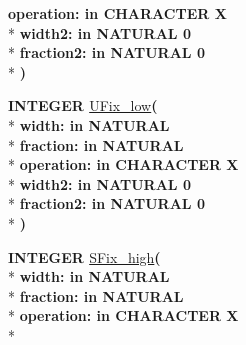 \begin{DoxyCompactItemize}
{\bfseries \textcolor{vhdlchar}{operation\+: }\textcolor{stringliteral}{in }\textcolor{vhdlchar}{C\+H\+A\+R\+A\+C\+T\+E\+R   \textquotesingle{}\+X\textquotesingle{}}}\\*
{\bfseries \textcolor{vhdlchar}{width2\+: }\textcolor{stringliteral}{in }\textcolor{vhdlchar}{N\+A\+T\+U\+R\+A\+L   0}}\\*
{\bfseries \textcolor{vhdlchar}{fraction2\+: }\textcolor{stringliteral}{in }\textcolor{vhdlchar}{N\+A\+T\+U\+R\+A\+L   0}}\\*
{\bfseries  )} 
\item 
{\bfseries {\bfseries \textcolor{comment}{I\+N\+T\+E\+G\+E\+R}\textcolor{vhdlchar}{ }}} \hyperlink{classfixed__pkg_a7f9fdb627be4d6f5667b2ce8f7c6d30f}{U\+Fix\+\_\+low}{\bfseries  ( }\\*
{\bfseries \textcolor{vhdlchar}{width\+: }\textcolor{stringliteral}{in }{\bfseries \textcolor{comment}{N\+A\+T\+U\+R\+A\+L}\textcolor{vhdlchar}{ }}}\\*
{\bfseries \textcolor{vhdlchar}{fraction\+: }\textcolor{stringliteral}{in }{\bfseries \textcolor{comment}{N\+A\+T\+U\+R\+A\+L}\textcolor{vhdlchar}{ }}}\\*
{\bfseries \textcolor{vhdlchar}{operation\+: }\textcolor{stringliteral}{in }\textcolor{vhdlchar}{C\+H\+A\+R\+A\+C\+T\+E\+R   \textquotesingle{}\+X\textquotesingle{}}}\\*
{\bfseries \textcolor{vhdlchar}{width2\+: }\textcolor{stringliteral}{in }\textcolor{vhdlchar}{N\+A\+T\+U\+R\+A\+L   0}}\\*
{\bfseries \textcolor{vhdlchar}{fraction2\+: }\textcolor{stringliteral}{in }\textcolor{vhdlchar}{N\+A\+T\+U\+R\+A\+L   0}}\\*
{\bfseries  )} 
\item 
{\bfseries {\bfseries \textcolor{comment}{I\+N\+T\+E\+G\+E\+R}\textcolor{vhdlchar}{ }}} \hyperlink{classfixed__pkg_a893c6f6a8b24350454e8cd0b683c9af7}{S\+Fix\+\_\+high}{\bfseries  ( }\\*
{\bfseries \textcolor{vhdlchar}{width\+: }\textcolor{stringliteral}{in }{\bfseries \textcolor{comment}{N\+A\+T\+U\+R\+A\+L}\textcolor{vhdlchar}{ }}}\\*
{\bfseries \textcolor{vhdlchar}{fraction\+: }\textcolor{stringliteral}{in }{\bfseries \textcolor{comment}{N\+A\+T\+U\+R\+A\+L}\textcolor{vhdlchar}{ }}}\\*
{\bfseries \textcolor{vhdlchar}{operation\+: }\textcolor{stringliteral}{in }\textcolor{vhdlchar}{C\+H\+A\+R\+A\+C\+T\+E\+R   \textquotesingle{}\+X\textquotesingle{}}}\\*

\end{DoxyCompactItemize}
